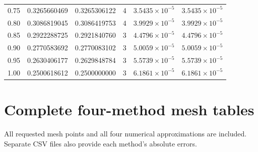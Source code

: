 \documentclass[11pt,a4paper]{article}
\begin{document}
\begin{longtable}{rrrrrr}
0.75 & 0.3265660469 & 0.3265306122 & 4 & $3.5435\times 10^{-5}$ & $3.5435\times 10^{-5}$ \\
0.80 & 0.3086819045 & 0.3086419753 & 4 & $3.9929\times 10^{-5}$ & $3.9929\times 10^{-5}$ \\
0.85 & 0.2922288725 & 0.2921840760 & 3 & $4.4796\times 10^{-5}$ & $4.4796\times 10^{-5}$ \\
0.90 & 0.2770583692 & 0.2770083102 & 3 & $5.0059\times 10^{-5}$ & $5.0059\times 10^{-5}$ \\
0.95 & 0.2630406177 & 0.2629848784 & 3 & $5.5739\times 10^{-5}$ & $5.5739\times 10^{-5}$ \\
1.00 & 0.2500618612 & 0.2500000000 & 3 & $6.1861\times 10^{-5}$ & $6.1861\times 10^{-5}$ \\
\end{longtable}
\endgroup
\clearpage\section{Complete four-method mesh tables}
All requested mesh points and all four numerical approximations are included.
Separate CSV files also provide each method's absolute errors.
\end{document}
